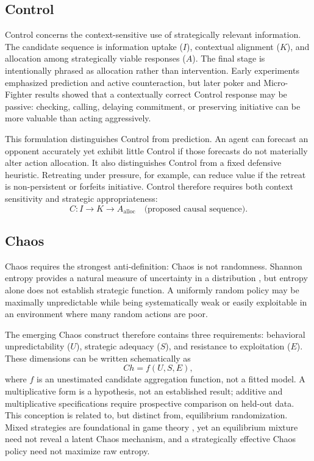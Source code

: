 \documentclass[journal]{IEEEtran}
\begin{document}
\subsection{Control}

Control concerns the context-sensitive use of strategically relevant information. The candidate sequence is information uptake ($I$), contextual alignment ($K$), and allocation among strategically viable responses ($A$). The final stage is intentionally phrased as allocation rather than intervention. Early experiments emphasized prediction and active counteraction, but later poker and Micro-Fighter results showed that a contextually correct Control response may be passive: checking, calling, delaying commitment, or preserving initiative can be more valuable than acting aggressively.

This formulation distinguishes Control from prediction. An agent can forecast an opponent accurately yet exhibit little Control if those forecasts do not materially alter action allocation. It also distinguishes Control from a fixed defensive heuristic. Retreating under pressure, for example, can reduce value if the retreat is non-persistent or forfeits initiative. Control therefore requires both context sensitivity and strategic appropriateness:
\begin{equation}
C: I \rightarrow K \rightarrow A_{\mathrm{alloc}} \quad \text{(proposed causal sequence).}
\end{equation}

\subsection{Chaos}

Chaos requires the strongest anti-definition: Chaos is not randomness. Shannon entropy provides a natural measure of uncertainty in a distribution \cite{shannon1948}, but entropy alone does not establish strategic function. A uniformly random policy may be maximally unpredictable while being systematically weak or easily exploitable in an environment where many random actions are poor.

The emerging Chaos construct therefore contains three requirements: behavioral unpredictability ($U$), strategic adequacy ($S$), and resistance to exploitation ($E$). These dimensions can be written schematically as
\begin{equation}
Ch = f(U, S, E),
\end{equation}
where $f$ is an unestimated candidate aggregation function, not a fitted model. A multiplicative form is a hypothesis, not an established result; additive and multiplicative specifications require prospective comparison on held-out data. This conception is related to, but distinct from, equilibrium randomization. Mixed strategies are foundational in game theory \cite{vonneumann1944,nash1950}, yet an equilibrium mixture need not reveal a latent Chaos mechanism, and a strategically effective Chaos policy need not maximize raw entropy.
\end{document}
